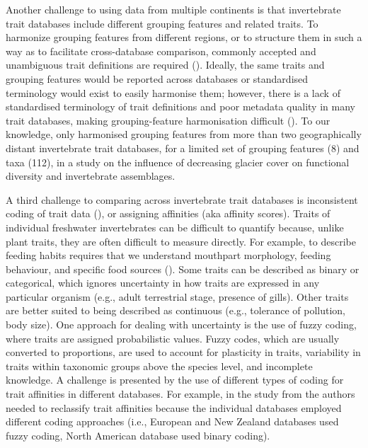 \documentclass{article}
\begin{document}
Another challenge to using data from multiple continents is that invertebrate trait databases include different grouping features and related traits. To harmonize grouping features from different regions, or to structure them in such a way as to facilitate cross-database comparison, commonly accepted and unambiguous trait definitions are required (\cite{schneider_towards_2019}). Ideally, the same traits and grouping features would be reported across databases or standardised terminology would exist to easily harmonise them; however, there is a lack of standardised terminology of trait definitions and poor metadata quality in many trait databases, making grouping-feature harmonisation difficult (\cite{baird_toward_2011, kissling_towards_2018}). To our knowledge, only \citet{brown_functional_2018} harmonised grouping features from more than two geographically distant invertebrate trait databases, for a limited set of grouping features (8) and taxa (112), in a study on the influence of decreasing glacier cover on functional diversity and invertebrate assemblages.

A third challenge to comparing across invertebrate trait databases is inconsistent coding of trait data (\cite{culp_incorporating_2011}), or assigning affinities (aka affinity scores). Traits of individual freshwater invertebrates can be difficult to quantify because, unlike plant traits, they are often difficult to measure directly. For example, to describe feeding habits requires that we understand mouthpart morphology, feeding behaviour, and specific food sources (\cite{moog_comprehensive_nodate}). Some traits can be described as binary or categorical, which ignores uncertainty in how traits are expressed in any particular organism (e.g., adult terrestrial stage, presence of gills). Other traits are better suited to being described as continuous (e.g., tolerance of pollution, body size). One approach for dealing with uncertainty is the use of fuzzy coding, where traits are assigned probabilistic values. Fuzzy codes, which are usually converted to proportions, are used to account for plasticity in traits, variability in traits within taxonomic groups above the species level, and incomplete knowledge. A challenge is presented by the use of different types of coding for trait affinities in different databases. For example, in the study from \citet{brown_functional_2018} the authors needed to reclassify trait affinities because the individual databases employed different coding approaches (i.e., European and New Zealand databases used fuzzy coding, North American database used binary coding). 
\end{document}
